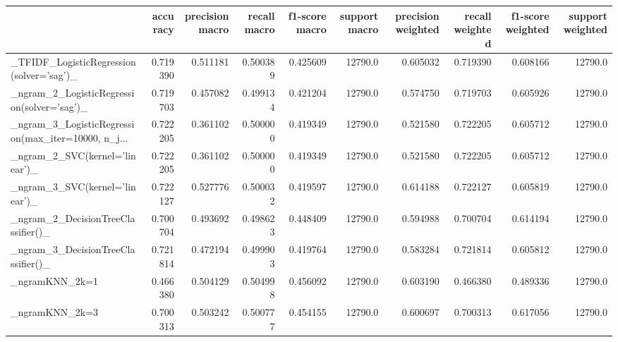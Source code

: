 \begin{tabular}{lrrrrrrrrr}
\toprule
{} &  accuracy &  precision macro &  recall macro &  f1-score macro &  support macro &  precision weighted &  recall weighted &  f1-score weighted &  support weighted \\
\midrule
\_TFIDF\_LogisticRegression(solver='sag')\_           &  0.719390 &         0.511181 &      0.500389 &        0.425609 &        12790.0 &            0.605032 &         0.719390 &           0.608166 &           12790.0 \\
\_ngram\_2\_LogisticRegression(solver='sag')\_         &  0.719703 &         0.457082 &      0.499134 &        0.421204 &        12790.0 &            0.574750 &         0.719703 &           0.605926 &           12790.0 \\
\_ngram\_3\_LogisticRegression(max\_iter=10000, n\_j... &  0.722205 &         0.361102 &      0.500000 &        0.419349 &        12790.0 &            0.521580 &         0.722205 &           0.605712 &           12790.0 \\
\_ngram\_2\_SVC(kernel='linear')\_                     &  0.722205 &         0.361102 &      0.500000 &        0.419349 &        12790.0 &            0.521580 &         0.722205 &           0.605712 &           12790.0 \\
\_ngram\_3\_SVC(kernel='linear')\_                     &  0.722127 &         0.527776 &      0.500032 &        0.419597 &        12790.0 &            0.614188 &         0.722127 &           0.605819 &           12790.0 \\
\_ngram\_2\_DecisionTreeClassifier()\_                 &  0.700704 &         0.493692 &      0.498623 &        0.448409 &        12790.0 &            0.594988 &         0.700704 &           0.614194 &           12790.0 \\
\_ngram\_3\_DecisionTreeClassifier()\_                 &  0.721814 &         0.472194 &      0.499903 &        0.419764 &        12790.0 &            0.583284 &         0.721814 &           0.605812 &           12790.0 \\
\_ngramKNN\_2k=1                                     &  0.466380 &         0.504129 &      0.504998 &        0.456092 &        12790.0 &            0.603190 &         0.466380 &           0.489336 &           12790.0 \\
\_ngramKNN\_2k=3                                     &  0.700313 &         0.503242 &      0.500777 &        0.454155 &        12790.0 &            0.600697 &         0.700313 &           0.617056 &           12790.0 \\

\end{tabular}
